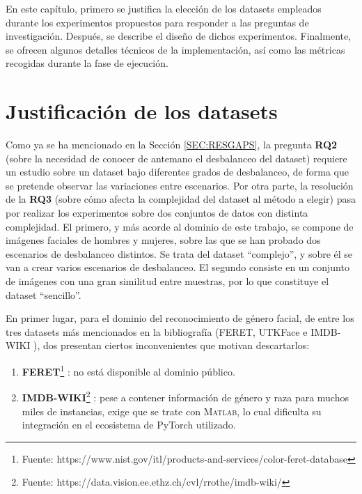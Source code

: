 En este capítulo, primero se justifica la elección de los datasets empleados durante los experimentos propuestos para responder a las preguntas de investigación. Después, se describe el diseño de dichos experimentos. Finalmente, se ofrecen algunos detalles técnicos de la implementación, así como las métricas recogidas durante la fase de ejecución.

\section{Justificación de los datasets\label{SEC:DATASETS}}

Como ya se ha mencionado en la Sección \ref{SEC:RESGAPS}, la pregunta \textbf{RQ2} (sobre la necesidad de conocer de antemano el desbalanceo del dataset) requiere un estudio sobre un dataset bajo diferentes grados de desbalanceo, de forma que se pretende observar las variaciones entre escenarios. Por otra parte, la resolución de la \textbf{RQ3} (sobre cómo afecta la complejidad del dataset al método a elegir) pasa por realizar los experimentos sobre dos conjuntos de datos con distinta complejidad.
El primero, y más acorde al dominio de este trabajo, se compone de imágenes faciales de hombres y mujeres, sobre las que se han probado dos escenarios de desbalanceo distintos. Se trata del dataset ``complejo'', y sobre él se van a crear varios escenarios de desbalanceo. El segundo consiste en un conjunto de imágenes con una gran similitud entre muestras, por lo que constituye el dataset ``sencillo''.

En primer lugar, para el dominio del reconocimiento de género facial, de entre los tres datasets más mencionados en la bibliografía (FERET, UTKFace e IMDB-WIKI \cite{yilmaz2021evolutionary,loo2018influence,islam2020human,garain2021gra_net,agbo2020deeply,dwivedi2019review,agbo2019face,khryashchev2013adaptive,tianyu2018human,vallimeena2019cnn}), dos presentan ciertos inconvenientes que motivan descartarlos:

\begin{enumerate}
    \fontsize{11pt}{12pt}\selectfont
    \item \textbf{FERET}\footnote{Fuente: https://www.nist.gov/itl/products-and-services/color-feret-database} \cite{yilmaz2021evolutionary,loo2018influence,dwivedi2019review,khryashchev2013adaptive,tianyu2018human,vallimeena2019cnn}: no está disponible al dominio público. %
    \item \textbf{IMDB-WIKI}\footnote{Fuente: https://data.vision.ee.ethz.ch/cvl/rrothe/imdb-wiki/} \cite{islam2020human,agbo2020deeply,agbo2019face}: pese a contener información de género y raza para muchos miles de instancias, exige que se trate con \textsc{Matlab}, lo cual dificulta su integración en el ecosistema de PyTorch utilizado. 
\end{enumerate}


